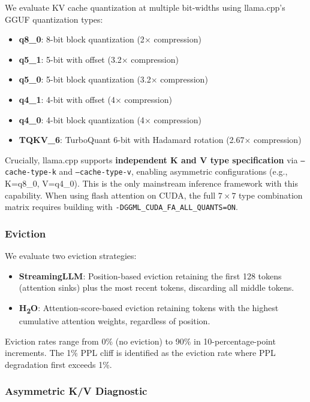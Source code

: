 We evaluate KV cache quantization at multiple bit-widths using llama.cpp's GGUF quantization types:

\begin{itemize}
    \item \textbf{q8\_0}: 8-bit block quantization (2$\times$ compression)
    \item \textbf{q5\_1}: 5-bit with offset (3.2$\times$ compression)
    \item \textbf{q5\_0}: 5-bit block quantization (3.2$\times$ compression)
    \item \textbf{q4\_1}: 4-bit with offset (4$\times$ compression)
    \item \textbf{q4\_0}: 4-bit block quantization (4$\times$ compression)
    \item \textbf{TQKV\_6}: TurboQuant 6-bit with Hadamard rotation (2.67$\times$ compression)
\end{itemize}

Crucially, llama.cpp supports \textbf{independent K and V type specification} via \texttt{--cache-type-k} and \texttt{--cache-type-v}, enabling asymmetric configurations (e.g., K=q8\_0, V=q4\_0). This is the only mainstream inference framework with this capability. When using flash attention on CUDA, the full $7 \times 7$ type combination matrix requires building with \texttt{-DGGML\_CUDA\_FA\_ALL\_QUANTS=ON}.

\subsubsection{Eviction}

We evaluate two eviction strategies:

\begin{itemize}
    \item \textbf{StreamingLLM}: Position-based eviction retaining the first 128 tokens (attention sinks) plus the most recent tokens, discarding all middle tokens.
    \item \textbf{H\textsubscript{2}O}: Attention-score-based eviction retaining tokens with the highest cumulative attention weights, regardless of position.
\end{itemize}

Eviction rates range from 0\% (no eviction) to 90\% in 10-percentage-point increments. The 1\% PPL cliff is identified as the eviction rate where PPL degradation first exceeds 1\%.

\subsubsection{Asymmetric K/V Diagnostic}

